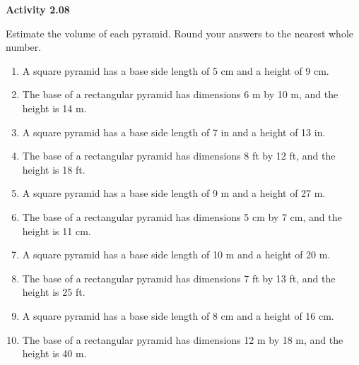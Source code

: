 \vspace{0.3ex}
\noindent\textbf{Activity 2.08}

\vspace{0.2ex}


Estimate the volume of each pyramid. Round your answers to the nearest whole number. 

\begin{enumerate}[noitemsep, label = \color{blue}\arabic*. ]
   \item A square pyramid has a base side length of 5 cm and a height of 9 cm.
   \item The base of a rectangular pyramid has dimensions 6 m by 10 m, and the height is 14 m.
   \item A square pyramid has a base side length of 7 in and a height of 13 in.
   \item The base of a rectangular pyramid has dimensions 8 ft by 12 ft, and the height is 18 ft.
    \item A square pyramid has a base side length of 9 m and a height of 27 m.
    \item The base of a rectangular pyramid has dimensions 5 cm by 7 cm, and the height is 11 cm.
    \item A square pyramid has a base side length of 10 m and a height of 20 m.
    \item The base of a rectangular pyramid has dimensions 7 ft by 13 ft, and the height is 25 ft.
    \item A square pyramid has a base side length of 8 cm and a height of 16 cm.
    \item The base of a rectangular pyramid has dimensions 12 m by 18 m, and the height is 40 m.
\end{enumerate}



